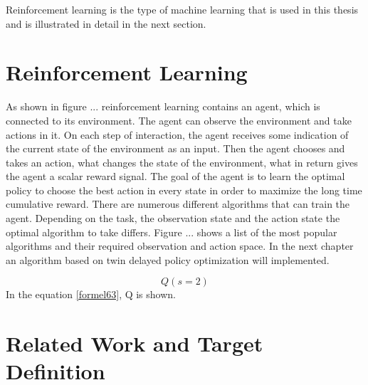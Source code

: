 Reinforcement learning is the type of machine learning that is used in this thesis and is illustrated in detail in the next section.

\section{Reinforcement Learning}

As shown in figure ... reinforcement learning contains an agent, which is connected to its environment. The agent can observe the environment and take actions in it. On each step of interaction, the agent receives some indication of the current state of the environment as an input. Then the agent chooses and takes an action, what changes the state of the environment, what in return gives the agent a scalar reward signal. The goal of the agent is to learn the optimal policy to choose the best action in every state in order to maximize the long time cumulative reward. There are numerous different algorithms that can train the agent. Depending on the task, the observation state and the action state the optimal algorithm to take differs.  \cite{kaelbling1996reinforcement} Figure ... shows a list of the most popular algorithms and their required observation and action space. In the next chapter an algorithm based on twin delayed policy optimization will implemented.

\begin{equation}
	Q(s=2)
	\label{formel63}
\end{equation}
In the equation \ref{formel63}, Q is shown.

\section{Related Work and Target Definition}

